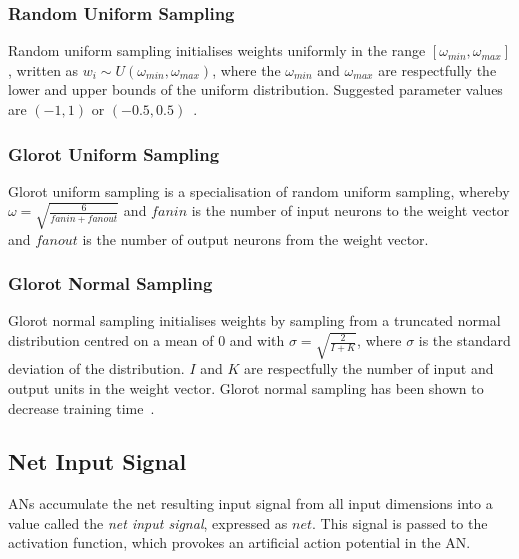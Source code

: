 \subsubsection{Random Uniform Sampling}\label{sec:anns:an:weights:random_uniform_sampling}

Random uniform sampling initialises weights uniformly in the range $[\omega_{min}, \omega_{max}]$, written as $w_{i} \sim \textit{U} (\omega_{min}, \omega_{max})$, where the $\omega_{min}$ and $\omega_{max}$ are respectfully the lower and upper bounds of the uniform distribution. Suggested parameter values are $(-1, 1)$ or $(-0.5, 0.5)$~\cite{ref:nguyen:1990}.


\subsubsection{Glorot Uniform Sampling}\label{sec:anns:an:weights:glorot_uniform_sampling}

Glorot uniform sampling is a specialisation of random uniform sampling, whereby $\omega = \sqrt{\frac{6}{fanin + fanout}}$ and $fanin$ is the number of input neurons to the weight vector and $fanout$ is the number of output neurons from the weight vector.

\subsubsection{Glorot Normal Sampling}\label{sec:anns:an:weights:glorot_normal_sampling}

Glorot normal sampling initialises weights by sampling from a truncated normal distribution centred on a mean of $0$ and with $\sigma = \sqrt{\frac{2}{I + K}}$, where $\sigma$ is the standard deviation of the distribution. $I$ and $K$ are respectfully the number of input and output units in the weight vector. Glorot normal sampling has been shown to decrease training time~\cite{ref:glorot:2010}.


\subsection{Net Input Signal}\label{sec:anns:an:net_input}

\acp{AN} accumulate the net resulting input signal from all input dimensions into a value called the \textit{net input signal}, expressed as $net$. This signal is passed to the activation function, which provokes an artificial action potential in the \acs{AN}.

